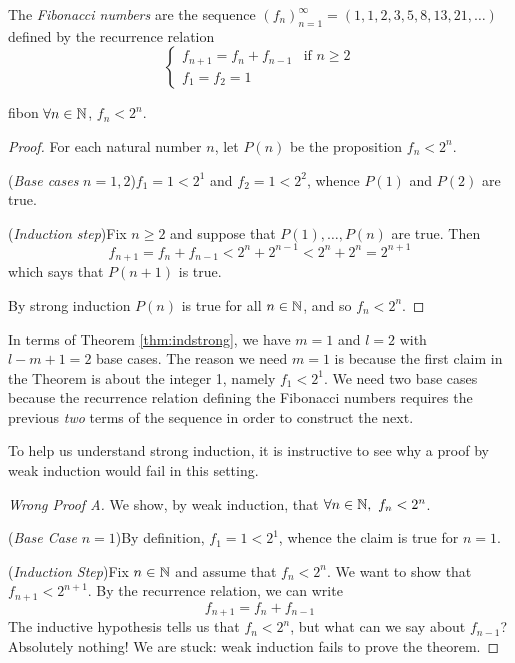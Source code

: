 \begin{defn}{}{}
	The \emph{Fibonacci numbers} are the sequence $(f_n)_{n=1}^\infty=(1,1,2,3,5,8,13,21,\ldots)$ defined by the recurrence relation
	\[
		\begin{cases}
			f_{n+1}=f_n+f_{n-1}&\text{if }n\ge 2\\
			f_1=f_2=1&
		\end{cases}
	\]
\end{defn}


\begin{thm}{}{fibon}
	$\forall n\in\mathbb{N}$, $f_n<2^n$.
\end{thm}

\begin{proof}
	For each natural number $n$, let $P(n)$ be the proposition $f_n<2^n$.\par
	(\emph{Base cases} $n=1,2$)\quad $f_1=1<2^1$ and $f_2=1<2^2$, whence $P(1)$ and $P(2)$ are true.\par
	(\emph{Induction step})\quad Fix $n\ge 2$ and suppose that $P(1),\ldots,P(n)$ are true. Then
	\[f_{n+1}=f_n+f_{n-1}<2^n+2^{n-1}<2^n+2^n=2^{n+1}\]
	which says that $P(n+1)$ is true.\par
	By strong induction $P(n)$ is true for all $n\in\mathbb{N}$, and so $f_n<2^n$.
\end{proof}

In terms of Theorem \ref{thm:indstrong}, we have $m=1$ and $l=2$ with $l-m+1=2$ base cases. The reason we need $m=1$ is because the first claim in the Theorem is about the integer 1, namely $f_1<2^1$. We need two base cases because the recurrence relation defining the Fibonacci numbers requires the previous \emph{two} terms of the sequence in order to construct the next.\par

To help us understand strong induction, it is instructive to see why a proof by weak induction would fail in this setting.

\begin{proof}[Wrong Proof A]
	We show, by weak induction, that $\forall n\in\mathbb{N},\ f_n<2^n$.\par
	(\emph{Base Case} $n=1$)\quad By definition, $f_1=1<2^1$, whence the claim is true for $n=1$.\par
	(\emph{Induction Step})\quad Fix $n\in\mathbb{N}$ and assume that $f_n<2^n$. We want to show that $f_{n+1}<2^{n+1}$. By the recurrence relation, we can write
	\[
		f_{n+1}=f_n+f_{n-1}\tag*{($\ast$)}
	\]
	The inductive hypothesis tells us that $f_n<2^n$, but what can we say about $f_{n-1}$? Absolutely nothing! We are stuck: weak induction fails to prove the theorem.
\end{proof}

